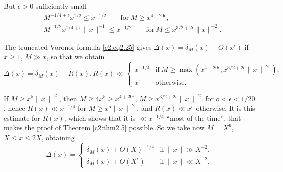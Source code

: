 But $\epsilon > 0$ sufficiently small
\begin{align*}
& M^{-1/4 + \epsilon} x^{1/2} \leq x^{-1/2}\qquad  \text{for}~ M\geq x^{4
  + 20 \epsilon},\\
& M^{-1/2} x^{1/4+ \epsilon} \parallel x\parallel^{-1}  \leq x^{-1/2}
\qquad\text{for}~ M\leq x^{3/2+ 2 \epsilon} \parallel x \parallel^{-2}.
\end{align*}

The truncated Voronor formula \eqref{c2:eq2.25} gives $\Delta  (x) =
\delta_M (x) + O(x^\epsilon)$ if $x\geq 1$, $M \gg x$, so that we
obtain
{\fontsize{10}{12}\selectfont
$$
\Delta  (x) = \delta_M (x) + R(x) , R(x) \ll 
\begin{cases}
  x^{-1/4} &  \text{if}~ M \geq \max (x^{4 + 20 \epsilon}, x^{3/2 + 2
    \epsilon} \parallel x \parallel^{-2}),\\
  x^\epsilon & \text{otherwise}.
\end{cases}
$$}

If $M \geq x^5 \parallel x \parallel^{-2}$, then $M\geq 4x^5 \geq x^{4
+ 20\epsilon}$, $M \geq x^{3/2+ 2 \epsilon} \parallel x\parallel^{-2}$
for $o < \epsilon < 1/20$, hence $R(x) \ll x^{-1/4}$ for $M \geq x^5
\parallel x \parallel^{-2}$, and $R(x) \ll x^\epsilon$\pageoriginale
otherwise. It is this estimate for $R(x)$, which shows that it is $\ll
x^{-1/4}$ ``most of the time'', that makes the proof of Theorem
\ref{c2:thm2.5} possible. So we take now $M= X^9$, $X \leq x \leq 2X$,
obtaining 
\begin{equation}
  \Delta  (x) = 
  \begin{cases}
    \delta_M (x) + O(X)^{-1/4} & \text{if}~ \parallel x \parallel \gg
    X^{-2},\\
    \delta_M (x) + O(X^\epsilon)& \text{if}~ \parallel x \parallel \ll X^{-2}.
  \end{cases}\label{c2:eq2.97}
\end{equation}

